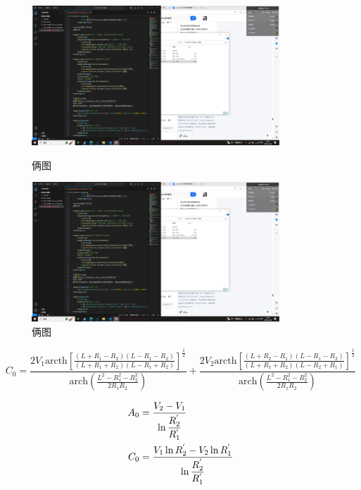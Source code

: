 \documentclass[12pt,a4paper]{article}%
\begin{document}
\begin{figure}[H]%
	\centering
	\begin{minipage}{0.48\textwidth}
		\centering
		\includegraphics[width=0.83\textwidth]{1}
		\caption{\fontsize{10pt}{15pt}\selectfont 俩图}
	\end{minipage}
	\hspace{0cm}%
	\hfill%
	\begin{minipage}{0.48\textwidth}
		\centering
		\includegraphics[width=0.83\textwidth]{1}
		\caption{\fontsize{10pt}{15pt}\selectfont 俩图}
	\end{minipage}
\end{figure}


\begin{equation}%
	C_0=\frac{2V_1\text{arcth}\left[ \frac{\left( L+R_1-R_2 \right) \left( L-R_1-R_2 \right)}{\left( L+R_1+R_2 \right) \left( L-R_1+R_2 \right)} \right] ^{\frac{1}{2}}}{\text{arch}\left( \frac{L^2-R_{1}^{2}-R_{2}^{2}}{2R_1R_2} \right)}+\frac{2V_2\text{arcth}\left[ \frac{\left( L+R_2-R_1 \right) \left( L-R_1-R_2 \right)}{\left( L+R_1+R_2 \right) \left( L-R_2+R_1 \right)} \right] ^{\frac{1}{2}}}{\text{arch}\left( \frac{L^2-R_{1}^{2}-R_{2}^{2}}{2R_1R_2} \right)}
\end{equation}

\begin{equation}
	\centering
	\begin{split}%
		A_0&=\frac{V_2-V_1}{\ln \dfrac{R_{2}^{'}}{R_{1}^{'}}}\\
		C_0&=\frac{V_1\ln R_{2}^{'}-V_2\ln R_{1}^{'}}{\ln \dfrac{R_{2}^{'}}{R_{1}^{'}}}
	\end{split}
\end{equation}
\end{document}

